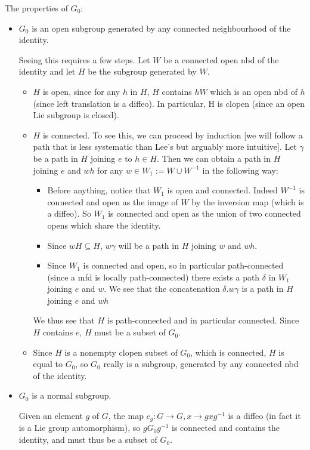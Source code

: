 \documentclass{report}
\theoremstyle{definition}
\begin{document}
The properties of $G_0$:
\begin{itemize}
    \item $G_0$ is an open subgroup generated by any connected neighbourhood of the identity.

    Seeing this requires a few steps. Let $W$ be a connected open nbd of the identity and let $H$ be the subgroup generated by $W$.
    \begin{itemize}
        \item $H$ is open, since for any $h$ in $H$, $H$ contains $hW$ which is an open nbd of $h$ (since left translation is a diffeo). In particular, H is clopen (since an open Lie subgroup is closed).
        \item $H$ is connected. To see this, we can proceed by induction [we will follow a path that is less systematic than Lee's but arguably more intuitive]. Let $\gamma$ be a path in $H$ joining $e$ to $h\in H$. Then we can obtain a path in $H$ joining $e$ and $wh$ for any $w\in W_1:=W\cup W^{-1}$ in the following way:
        \begin{itemize}
            \item Before anything, notice that $W_1$ is open and connected. Indeed $W^{-1}$ is connected and open as the image of $W$ by the inversion map (which is a diffeo). So $W_1$ is connected and open as the union of two connected opens which share the identity.
            \item Since $wH\subseteq H$, $w\gamma$ will be a path in $H$ joining $w$ and $wh$.
            \item Since $W_1$ is connected and open, so in particular path-connected (since a mfd is locally path-connected) there exists a path $\delta$ in $W_1$ joining $e$ and $w$. We see that the concatenation $\delta.w\gamma$ is a path in $H$ joining $e$ and $wh$
        \end{itemize}

        We thus see that $H$ is path-connected and in particular connected. Since $H$ contains $e$, $H$ must be a subset of $G_0$.
        \item Since $H$ is a nonempty clopen subset of $G_0$, which is connected, $H$ is equal to $G_0$, so $G_0$ really is a subgroup, generated by any connected nbd of the identity.
    \end{itemize}

    \item $G_0$ is a normal subgroup.

    Given an element $g$ of $G$, the map $c_g:G\rightarrow G,x\rightarrow gxg^{-1}$ is a diffeo (in fact it is a Lie group automorphism), so $gG_0 g^{-1}$ is connected and contains the identity, and must thus be a subset of $G_0$.


\end{itemize}
\end{document}
